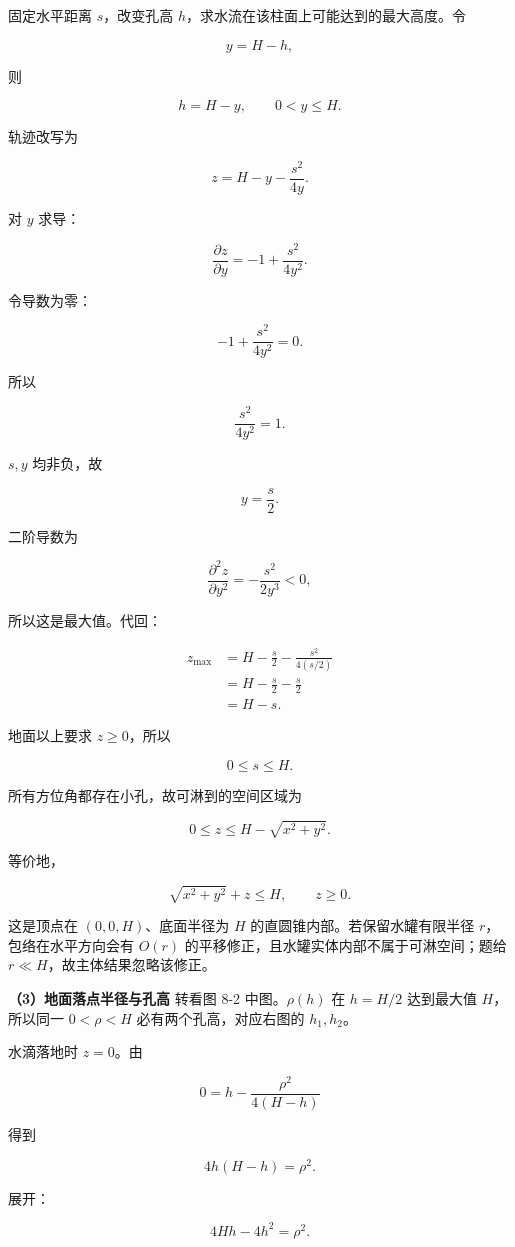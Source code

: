 \documentclass[12pt,a4paper,UTF8]{ctexart}
\begin{document}
固定水平距离 \(s\)，改变孔高
\(h\)，求水流在该柱面上可能达到的最大高度。令

\[y=H-h,\]

则

\[h=H-y,\qquad 0<y\leq H.\]

轨迹改写为

\[z=H-y-\frac{s^2}{4y}.\]

对 \(y\) 求导：

\[\frac{\partial z}{\partial y}
=-1+\frac{s^2}{4y^2}.\]

令导数为零：

\[-1+\frac{s^2}{4y^2}=0.\]

所以

\[\frac{s^2}{4y^2}=1.\]

\(s,y\) 均非负，故

\[y=\frac s2.\]

二阶导数为

\[\frac{\partial^2z}{\partial y^2}
=-\frac{s^2}{2y^3}<0,\]

所以这是最大值。代回：

\[\begin{aligned}
z_{\max}
&=H-\frac s2-\frac{s^2}{4(s/2)}\\
&=H-\frac s2-\frac s2\\
&=H-s.
\end{aligned}\]

地面以上要求 \(z\geq0\)，所以

\[0\leq s\leq H.\]

所有方位角都存在小孔，故可淋到的空间区域为

\[\boxed{
0\leq z\leq H-\sqrt{x^2+y^2}
}.\]

等价地，

\[\boxed{
\sqrt{x^2+y^2}+z\leq H,\qquad z\geq0
}.\]

这是顶点在 \((0,0,H)\)、底面半径为 \(H\)
的直圆锥内部。若保留水罐有限半径 \(r\)，包络在水平方向会有 \(O(r)\)
的平移修正，且水罐实体内部不属于可淋空间；题给
\(r\ll H\)，故主体结果忽略该修正。

\textbf{（3）地面落点半径与孔高} 转看图 8-2 中图。\(\rho(h)\) 在
\(h=H/2\) 达到最大值 \(H\)，所以同一 \(0<\rho<H\)
必有两个孔高，对应右图的 \(h_1,h_2\)。

水滴落地时 \(z=0\)。由

\[0=h-\frac{\rho^2}{4(H-h)}\]

得到

\[4h(H-h)=\rho^2.\]

展开：

\[4Hh-4h^2=\rho^2.\]
\end{document}
